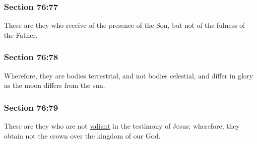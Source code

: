 	\subsubsection{Section 76:77} %
		\label{DC76-77}

		These are they who receive of the presence of the Son, but not of the fulness of the Father.


	\subsubsection{Section 76:78} %
		\label{DC76-78}

		Wherefore, they are bodies terrestrial, and not bodies celestial, and differ in glory as the moon differs from the sun.


	\subsubsection{Section 76:79} %
		\label{DC76-79}

		These are they who are not \hyperref[VALIANT]{valiant} in the testimony of Jesus; wherefore, they obtain not the crown over the kingdom of our God.


